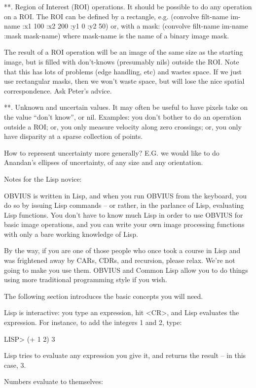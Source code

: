 **. Region of Interest (ROI) operations.
	It should be possible to do any operation on a ROI.
	The ROI can be defined by a rectangle, e.g.
	(convolve filt-name im-name :x1 100 :x2 200 :y1 0 :y2 50)
	or, with a mask:
	(convolve filt-name im-name :mask mask-name)
	where mask-name is the name of a binary image mask.

	The result of a ROI operation will be an image of the same
	size as the starting image, but is filled with don't-knows
	(presumably nils) outside the ROI.  Note that this has
	lots of problems (edge handling, etc) and wastes space.
	If we just use rectangular masks, then we won't waste
	space, but will lose the nice spatial correspondence.
	Ask Peter's advice.

**.  Unknown and uncertain values.
	It may often be useful to have pixels take on the value
	``don't know'', or nil.  Examples: you don't bother
	to do an operation outside a ROI; or, you only measure
	velocity along zero crossings; or, you only have disparity
	at a sparse collection of points.

	How to represent uncertainty more generally?  E.G. we
	would like to do Anandan's ellipses of uncertainty, of
	any size and any orientation.


Notes for the Lisp novice:

OBVIUS is written in Lisp, and when you run OBVIUS from the keyboard,
you do so by issuing Lisp commands -- or rather, in the parlance of Lisp,
evaluating Lisp functions.  You don't have to know much
Lisp in order to use OBVIUS for basic image operations, and you can
write your own image processing functions with only a
bare working knowledge of Lisp.

By the way, if you are one of those people who once took a course in
Lisp and was frightened away by CARs, CDRs, and recursion,
please relax.  We're not going to make you use them.
OBVIUS and Common Lisp allow you to do things using
more traditional programming style if you wish.

The following section introduces the basic concepts you will need.

Lisp is interactive: you type an expression, hit <CR>, and Lisp evaluates
the expression.  For instance, to add the integers 1 and 2, type:

LISP> (+ 1 2)
3

Lisp tries to evaluate any expression you give it, and returns the
result -- in this case, 3.

Numbers evaluate to themselves:

